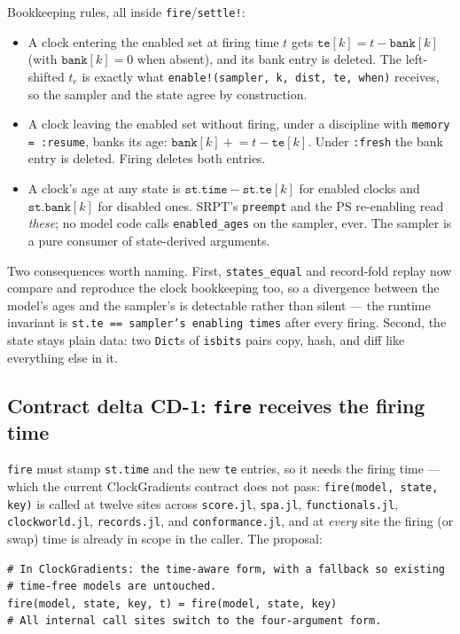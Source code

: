 \documentclass[11pt]{article}
\newcommand{\code}[1]{\texttt{#1}}
\begin{document}
Bookkeeping rules, all inside \code{fire}/\code{settle!}:

\begin{itemize}
\item A clock entering the enabled set at firing time $t$ gets
  $\code{te}[k] = t - \code{bank}[k]$ (with $\code{bank}[k] = 0$ when absent),
  and its bank entry is deleted. The left-shifted $t_e$ is exactly what
  \code{enable!(sampler, k, dist, te, when)} receives, so the sampler and the
  state agree by construction.
\item A clock leaving the enabled set without firing, under a discipline with
  \code{memory = :resume}, banks its age:
  $\code{bank}[k] \mathrel{+}= t - \code{te}[k]$. Under \code{:fresh} the
  bank entry is deleted. Firing deletes both entries.
\item A clock's age at any state is $\code{st.time} - \code{st.te}[k]$ for
  enabled clocks and $\code{st.bank}[k]$ for disabled ones. SRPT's
  \code{preempt} and the PS re-enabling read \emph{these}; no model code
  calls \code{enabled\_ages} on the sampler, ever. The sampler is a pure
  consumer of state-derived arguments.
\end{itemize}

Two consequences worth naming. First, \code{states\_equal} and record-fold
replay now compare and reproduce the clock bookkeeping too, so a divergence
between the model's ages and the sampler's is detectable rather than silent
--- the runtime invariant is \code{st.te == sampler's enabling times} after
every firing. Second, the state stays plain data: two \code{Dict}s of
\code{isbits} pairs copy, hash, and diff like everything else in it.

\subsection{Contract delta CD-1: \code{fire} receives the firing time}
\label{sec:cd1}

\code{fire} must stamp \code{st.time} and the new \code{te} entries, so it
needs the firing time --- which the current ClockGradients contract does not
pass: \code{fire(model, state, key)} is called at twelve sites across
\code{score.jl}, \code{spa.jl}, \code{functionals.jl}, \code{clockworld.jl},
\code{records.jl}, and \code{conformance.jl}, and at \emph{every} site the
firing (or swap) time is already in scope in the caller. The proposal:

\begin{lstlisting}
# In ClockGradients: the time-aware form, with a fallback so existing
# time-free models are untouched.
fire(model, state, key, t) = fire(model, state, key)
# All internal call sites switch to the four-argument form.
\end{lstlisting}
\end{document}
